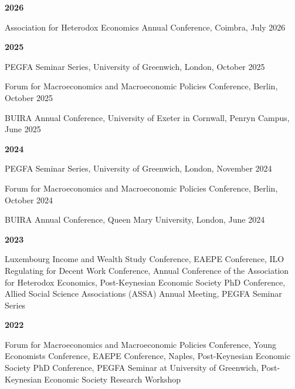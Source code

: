 \documentclass[letterpaper]{article}
\renewenvironment{itemize}{
  \begin{list}{}
    { \setlength{\itemsep}{5pt}
      \setlength{\parsep}{0pt}
      \setlength{\topsep}{0pt}
      \setlength{\leftmargin}{0em} } }{
  \end{list}}
\begin{document}
\textbf{2026}
\begin{itemize}
    \item Association for Heterodox Economics Annual Conference, Coimbra, July 2026
\end{itemize}


\textbf{2025}
\begin{itemize}
    \item PEGFA Seminar Series, University of Greenwich, London, October 2025
    \item Forum for Macroeconomics and Macroeconomic Policies Conference, Berlin, October 2025
    \item BUIRA Annual Conference, University of Exeter in Cornwall, Penryn Campus, June 2025
\end{itemize}

\textbf{2024}
\begin{itemize}
    \item PEGFA Seminar Series, University of Greenwich, London, November 2024
    \item Forum for Macroeconomics and Macroeconomic Policies Conference, Berlin, October 2024
    \item BUIRA Annual Conference, Queen Mary University, London, June 2024
\end{itemize}

\textbf{2023}
\begin{itemize}
    \item Luxembourg Income and Wealth Study Conference, EAEPE Conference, ILO Regulating for Decent Work Conference, Annual Conference of the Association for Heterodox Economics, Post-Keynesian Economic Society PhD Conference, Allied Social Science Associations (ASSA) Annual Meeting, PEGFA Seminar Series
\end{itemize}
\textbf{2022}
\begin{itemize}
    \item Forum for Macroeconomics and Macroeconomic Policies Conference, Young Economists Conference, EAEPE Conference, Naples, Post-Keynesian Economic Society PhD Conference, PEGFA Seminar at University of Greenwich, Post-Keynesian Economic Society Research Workshop
\end{itemize}
\end{document}
